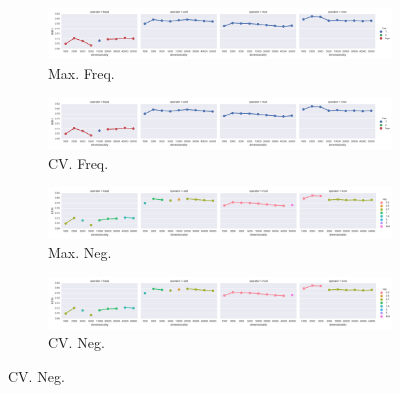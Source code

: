  
\clearpage
{}
\recalctypearea


\begin{landscape}
\thispagestyle{empty} %

\begin{figure}
  \centering

  \begin{subfigure}[t]{0.6\textwidth}
    \includegraphics[width=\textwidth]{supplement/figures/KS14-max_-selection-freq}
    \caption{Max. Freq.}
    \label{fig:}
  \end{subfigure}
  \begin{subfigure}[t]{0.6\textwidth}
    \includegraphics[width=\textwidth]{supplement/figures/KS14-cross_validation-selection-freq}
    \caption{CV. Freq.}
    \label{fig:}
  \end{subfigure}

  \begin{subfigure}[t]{0.6\textwidth}
    \includegraphics[width=\textwidth]{supplement/figures/KS14-max_-selection-neg}
    \caption{Max. Neg.}
    \label{fig:}
  \end{subfigure}
  \begin{subfigure}[t]{0.6\textwidth}
    \includegraphics[width=\textwidth]{supplement/figures/KS14-cross_validation-selection-neg}
    \caption{CV. Neg.}
    \label{fig:}
  \end{subfigure}


\end{figure}
\end{landscape}
